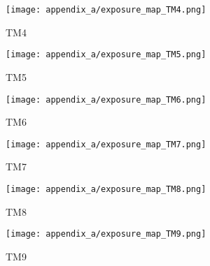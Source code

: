 \begin{figure}[htbp]
    \centering
    \texttt{[image: appendix\_a/exposure\_map\_TM4.png]}
    \caption{TM4}
    \label{fig:TM4}
\end{figure}

\begin{figure}[htbp]
    \centering
    \texttt{[image: appendix\_a/exposure\_map\_TM5.png]}
    \caption{TM5}
    \label{fig:TM5}
\end{figure}

\begin{figure}[htbp]
    \centering
    \texttt{[image: appendix\_a/exposure\_map\_TM6.png]}
    \caption{TM6}
    \label{fig:TM6}
\end{figure}

\begin{figure}[htbp]
    \centering
    \texttt{[image: appendix\_a/exposure\_map\_TM7.png]}
    \caption{TM7}
    \label{fig:TM7}
\end{figure}

\begin{figure}[htbp]
    \centering
    \texttt{[image: appendix\_a/exposure\_map\_TM8.png]}
    \caption{TM8}
    \label{fig:TM8}
\end{figure}

\begin{figure}[htbp]
    \centering
    \texttt{[image: appendix\_a/exposure\_map\_TM9.png]}
    \caption{TM9}
    \label{fig:TM9}
\end{figure}
%
